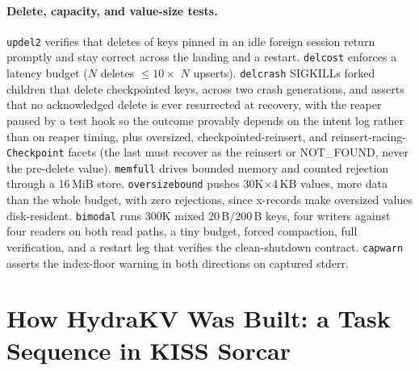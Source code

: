 \documentclass{article}
\begin{document}
\paragraph{Delete, capacity, and value-size tests.}
\texttt{updel2} verifies that deletes of keys pinned in an idle foreign session return promptly and stay correct across the landing and a restart. \texttt{delcost} enforces a latency budget ($N$ deletes $\leq 10\times$ $N$ upserts). \texttt{delcrash} SIGKILLs forked children that delete checkpointed keys, across two crash generations, and asserts that no acknowledged delete is ever resurrected at recovery, with the reaper paused by a test hook so the outcome provably depends on the intent log rather than on reaper timing, plus oversized, checkpointed-reinsert, and reinsert-racing-\texttt{Checkpoint} facets (the last must recover as the reinsert or NOT\_FOUND, never the pre-delete value). \texttt{memfull} drives bounded memory and counted rejection through a 16\,MiB store. \texttt{oversizebound} pushes 30K$\times$4\,KB values, more data than the whole budget, with zero rejections, since x-records make oversized values disk-resident. \texttt{bimodal} runs 300K mixed 20\,B/200\,B keys, four writers against four readers on both read paths, a tiny budget, forced compaction, full verification, and a restart leg that verifies the clean-shutdown contract. \texttt{capwarn} asserts the index-floor warning in both directions on captured stderr.

\section{How HydraKV Was Built: a Task Sequence in KISS Sorcar}
\label{sec:sorcar}
\end{document}
